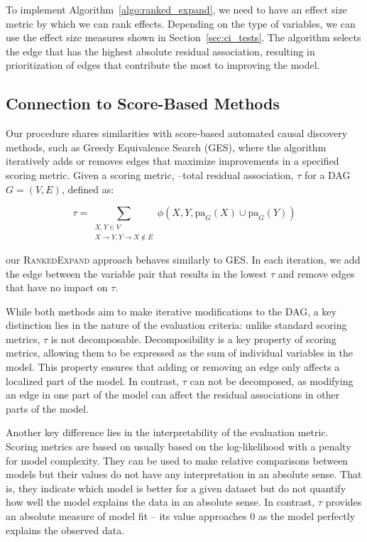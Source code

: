 \documentclass{uai2025} %
\begin{document}
To implement Algorithm~\ref{algo:ranked_expand}, we need to have an effect size
metric by which we can rank effects. Depending on the type of variables, we can
use the effect size measures shown in Section~\ref{sec:ci_tests}. The algorithm
selects the edge that has the highest absolute residual association, resulting
in prioritization of edges that contribute the most to improving the model.

\subsection{Connection to Score-Based Methods}

Our procedure shares similarities with score-based automated causal discovery
methods, such as Greedy Equivalence Search (GES), where the algorithm
iteratively adds or removes edges that maximize improvements in a specified
scoring metric. Given a scoring metric, --total residual association, $ \tau $ for 
a DAG $ G = (V, E) $, defined as:

\begin{equation}
	\tau = \sum_{\substack{X, Y \in V \\ X \rightarrow Y, Y \rightarrow X \not \in E}}   \phi(X, Y, \mathrm{pa}_G(X) \cup \mathrm{pa}_G(Y))
\end{equation}

our \textsc{RankedExpand} approach behaves similarly to GES. In each iteration,
we add the edge between the variable pair that results in the lowest $ \tau $
and remove edges that have no impact on $ \tau $.

While both methods aim to make iterative modifications to the DAG, a key
distinction lies in the nature of the evaluation criteria: unlike standard
scoring metrics, $ \tau $ is not decomposable. Decomposibility is a key
property of scoring metrics, allowing them to be expressed as the sum of
individual variables in the model. This property ensures that adding or
removing an edge only affects a localized part of the model. In contrast, $
\tau $ can not be decomposed, as modifying an edge in one part of the model can
affect the residual associations in other parts of the model.

Another key difference lies in the interpretability of the evaluation metric.
Scoring metrics are based on usually based on the log-likelihood with a penalty
for model complexity. They can be used to make relative comparisons between
models but their values do not have any interpretation in an absolute sense.
That is, they indicate which model is better for a given dataset but do not
quantify how well the model explains the data in an absolute sense. In
contrast, $ \tau $ provides an absolute measure of model fit -- its value
approaches $ 0 $ as the model perfectly explains the observed data.
\end{document}
